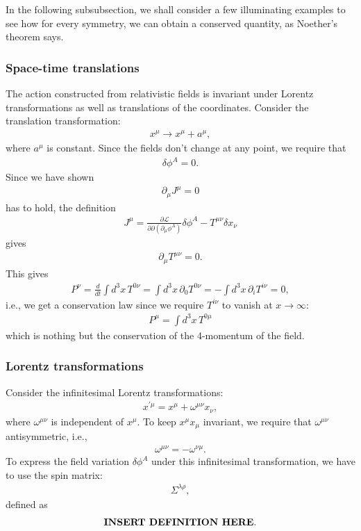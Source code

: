 \documentclass[a4paper,11pt]{article}
\numberwithin{equation}{section}
\theoremstyle{definition}
\newcommand{\p}{\partial}
\newcommand{\lag}{\mathcal{L}}
\begin{document}
In the following subsubsection, we shall consider a few illuminating examples to see how for every symmetry, we can obtain a conserved quantity, as Noether's theorem says.\\

\subsubsection{Space-time translations}


The action constructed from relativistic fields is invariant under Lorentz transformations as well as translations of the coordinates. Consider the translation transformation:
\begin{align}
x^\mu \to x^\mu + a^\mu,
\end{align}
where $a^\mu$ is constant. Since the fields don't change at any point, we require that
\begin{align}
\delta \phi^A = 0.
\end{align}
Since we have shown 
\begin{align}
\p_\mu J^\mu = 0
\end{align}
has to hold, the definition
\begin{align}
J^\mu = \frac{\p \lag}{\p \p(\p_\mu \phi^A)}\delta \phi^A - T^{\mu\nu}\delta x_\nu
\end{align}
gives
\begin{align}
\p_\mu T^{\mu\nu} = 0.
\end{align}
This gives
\begin{align}
P^\nu = \frac{d}{dt}\int d^3x\, T^{0\nu} = \int d^3x\, \p_0 T^{0\nu} = - \int d^3x\, \p_i T^{i\nu} = 0,
\end{align}
i.e., we get a conservation law since we require $T^{i\nu}$ to vanish at $x \to \infty$:
\begin{align}
\boxed{P^\mu = \int d^3x\, T^{0\mu}}
\end{align}
which is nothing but the conservation of the 4-momentum of the field.




\subsubsection{Lorentz transformations}


Consider the infinitesimal Lorentz transformations:
\begin{align}
x^{'\mu} = x^\mu + \omega^{\mu\nu}x_\nu,
\end{align}
where $\omega^{\mu\nu}$ is independent of $x^\mu$. To keep $x^\mu x_\mu$ invariant, we require that $\omega^{\mu\nu}$ antisymmetric, i.e.,
\begin{align}
\omega^{\mu\nu} = -\omega^{\nu\mu}.
\end{align}
To express the field variation $\delta \phi^A$ under this infinitesimal transformation, we have to use the spin matrix:
\begin{align}
\Sigma^{\lambda\rho},
\end{align}
defined as
\begin{align}
\text{\textbf{INSERT DEFINITION HERE}}.
\end{align}
\end{document}
